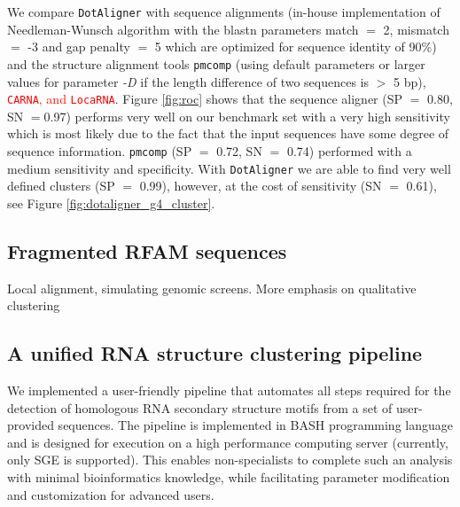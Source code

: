 \documentclass[a4paper,twoside]{article}
\newcommand\dotaligner{\texttt{DotAligner}}
\newcommand\pmcomp{\texttt{pmcomp}}
\newcommand\locarna{\texttt{LocaRNA}}
\newcommand\pvclust{\texttt{pvclust}}
\newcommand\carna{\texttt{CARNA}}
\newcommand{\RED}[1]{\textcolor{red}{#1}}
\newcommand{\GRAY}[1]{\textcolor{mygray}{#1}}
\begin{document}
\GRAY{We compare \dotaligner{} with sequence alignments (in-house
implementation of Needleman-Wunsch algorithm with the blastn parameters match
$=$ 2, mismatch $=$ -3 and gap penalty $=$ 5 which are optimized for sequence
identity of 90\%) and the structure alignment tools \pmcomp{} (using default
parameters or larger values for parameter \emph{-D} if the length difference of
two sequences is $>$ 5 bp), \RED{\carna, and \locarna}. Figure \ref{fig:roc}
shows that the sequence aligner (SP $=$ 0.80, SN $=$0.97) performs very well on
our benchmark set with a very high sensitivity which is most likely due to the
fact that the input sequences have some degree of sequence information.
\pmcomp{} (SP $=$ 0.72, SN $=$ 0.74) performed with a medium sensitivity and
specificity. With \dotaligner{} we are able to find very well defined clusters (SP
$=$ 0.99), however, at the cost of sensitivity (SN $=$ 0.61), see Figure
\ref{fig:dotaligner_g4_cluster}.}

\begin{figure*}[!ht]
  \centering
  {}
  \caption{\GRAY{Automated hierarchical clustering of 300 sequences from 10 H/ACA
  snoRNA families. The dissimilarity matrix was calculated through \dotaligner{}
  with gap penalty 4. The clustering was conducted by the R-package \pvclust{}
  with multiscale bootstrap resampling with number of bootstrap 1000. We define
  clusters (red rectangles) as Approximately Unbiased (AU) \textit{p}-values $>$
  0.95 rejecting the hypothesis that ``the cluster does not exist`` with
  significance level 0.05.}}
  \label{fig:dotaligner_g4_cluster}
\end{figure*}


\subsection{Fragmented RFAM sequences} 

Local alignment, simulating genomic screens. More emphasis on qualitative clustering


\subsection{ A unified RNA structure clustering pipeline }

\noindent We implemented a user-friendly pipeline that automates all steps required 
for the detection of homologous RNA secondary structure motifs from a set of user-
provided sequences. The pipeline is implemented in BASH programming language and is 
designed for execution on a high performance computing server (currently, only SGE 
is supported). This enables non-specialists to complete such an analysis with 
minimal bioinformatics knowledge, while facilitating parameter modification and 
customization for advanced users. 
\end{document}
